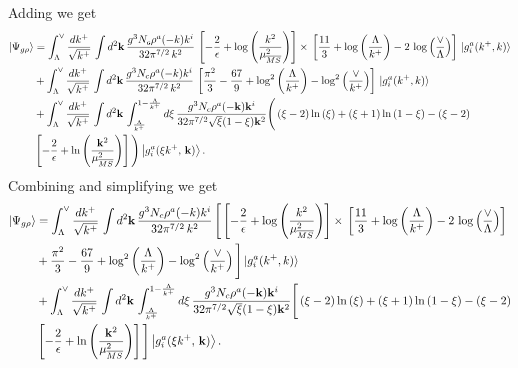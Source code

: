 \documentclass[10pt]{article}
\numberwithin{equation}{section}
\begin{document}
Adding we get
\begin{align}
     \left|\Psi_{g\rho}\right\rangle & =  \int_{\Lambda}^{\vee}\frac{dk^{+}}{\sqrt{k^{+}}}\,\int d^{2}\mathbf{k}\,\frac{g^{3}N_{c}\rho^{a}(-k)k^{i}}{32\pi^{7/2}\,k^{2}}\,\left[-\frac{2}{\epsilon}+\log{\left(\frac{k^{2}}{\mu^{2}_{\overline{MS}}}\right)}\right]\times\, \left[\frac{11}{3}+\log{\left(\frac{\Lambda}{k^{+}}\right)}-2\,\log{\left(\frac{\vee}{\Lambda}\right)}\right]\, \ket{g^{a}_{i}(k^{+},k)}\notag \\ & + \int_{\Lambda}^{\vee}\frac{dk^{+}}{\sqrt{k^{+}}}\,\int d^{2}\mathbf{k}\,\frac{g^{3}N_{c}\rho^{a}(-k)k^{i}}{32\pi^{7/2}\,k^{2}}\, \left[\frac{\pi^{2}}{3} - \frac{67}{9} +\log^{2}\left(\frac{\Lambda}{k^{+}}\right)-\log^{2}\left(\frac{\vee}{k^{+}}\right)\right]\, \ket{g^{a}_{i}(k^{+},k)}\notag \\ & + \int_{\Lambda}^{\vee}\frac{dk^{+}}{\sqrt{k^{+}}}\,\int d^{2}\mathbf{k}\,\int_{\frac{\Lambda}{k^{+}}}^{1-\frac{\Lambda}{k^{+}}}d\xi\,\frac{g^{3}N_{c}\rho^{a}(-\mathbf{k})\mathbf{k}^{i}}{32\pi^{7/2}\sqrt{\xi}(1-\xi)\mathbf{k}^{2}}\Bigg(\left(\xi-2\right)\ln\left(\xi\right)+\left(\xi+1\right)\ln\left(1-\xi\right)-\left(\xi-2\right)\notag \\ & \left[-\frac{2}{\epsilon}+\ln\left(\frac{\mathbf{k}^{2}}{\mu_{\overline{MS}}^{2}}\right)\right]\Bigg)\left|g_{i}^{a}(\xi k^{+},\, \mathbf{k})\right\rangle.
\end{align}
Combining and simplifying we get
\begin{align}\label{combinedgrho}
     \left|\Psi_{g\rho}\right\rangle & =  \int_{\Lambda}^{\vee}\frac{dk^{+}}{\sqrt{k^{+}}}\,\int d^{2}\mathbf{k}\,\frac{g^{3}N_{c}\rho^{a}(-k)k^{i}}{32\pi^{7/2}\,k^{2}}\,\Bigg[\left[-\frac{2}{\epsilon}+\log{\left(\frac{k^{2}}{\mu^{2}_{\overline{MS}}}\right)}\right]\times\, \left[\frac{11}{3}+\log{\left(\frac{\Lambda}{k^{+}}\right)}-2\,\log{\left(\frac{\vee}{\Lambda}\right)}\right]\notag \\ & + \frac{\pi^{2}}{3} - \frac{67}{9} +\log^{2}\left(\frac{\Lambda}{k^{+}}\right)-\log^{2}\left(\frac{\vee}{k^{+}}\right)\Bigg] \ket{g^{a}_{i}(k^{+},k)}\notag \\ & + \int_{\Lambda}^{\vee}\frac{dk^{+}}{\sqrt{k^{+}}}\,\int d^{2}\mathbf{k}\,\int_{\frac{\Lambda}{k^{+}}}^{1-\frac{\Lambda}{k^{+}}}d\xi\,\frac{g^{3}N_{c}\rho^{a}(-\mathbf{k})\mathbf{k}^{i}}{32\pi^{7/2}\sqrt{\xi}(1-\xi)\mathbf{k}^{2}}\Bigg[\left(\xi-2\right)\ln\left(\xi\right)+\left(\xi+1\right)\ln\left(1-\xi\right)-\left(\xi-2\right)\notag \\ & \left[-\frac{2}{\epsilon}+\ln\left(\frac{\mathbf{k}^{2}}{\mu_{\overline{MS}}^{2}}\right)\right]\Bigg]\left|g_{i}^{a}(\xi k^{+},\, \mathbf{k})\right\rangle.
\end{align}
\end{document}
